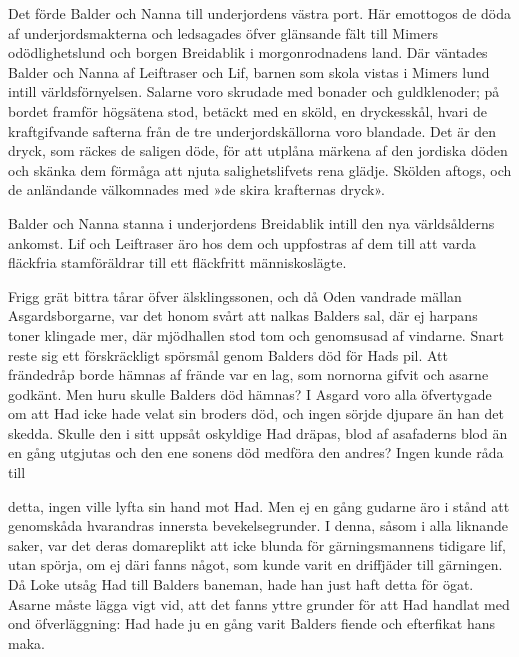 Det förde Balder och Nanna till underjordens västra port. Här emottogos
de döda af underjordsmakterna och ledsagades öfver glänsande fält till
Mimers odödlighetslund och borgen Breidablik i morgonrodnadens land. Där
väntades Balder och Nanna af Leiftraser och Lif, barnen som skola vistas
i Mimers lund intill världsförnyelsen. Salarne voro skrudade med bonader
och guldklenoder; på bordet framför högsätena stod, betäckt med en
sköld, en dryckesskål, hvari de kraftgifvande safterna från de tre
underjordskällorna voro blandade. Det är den dryck, som räckes de
saligen döde, för att utplåna märkena af den jordiska döden och skänka
dem förmåga att njuta salighetslifvets rena glädje. Skölden aftogs, och
de anländande välkomnades med »de skira krafternas dryck».

Balder och Nanna stanna i underjordens Breidablik intill den nya
världsålderns ankomst. Lif och Leiftraser äro hos dem och uppfostras af
dem till att varda fläckfria stamföräldrar till ett fläckfritt
människoslägte.

Frigg grät bittra tårar öfver älsklingssonen, och då Oden vandrade
mällan Asgardsborgarne, var det honom svårt att nalkas Balders sal, där
ej harpans toner klingade mer, där mjödhallen stod tom och genomsusad af
vindarne. Snart reste sig ett förskräckligt spörsmål genom Balders död
för Hads pil. Att frändedråp borde hämnas af frände var en lag, som
nornorna gifvit och asarne godkänt. Men huru skulle Balders död hämnas?
I Asgard voro alla öfvertygade om att Had icke hade velat sin broders
död, och ingen sörjde djupare än han det skedda. Skulle den i sitt
uppsåt oskyldige Had dräpas, blod af asafaderns blod än en gång utgjutas
och den ene sonens död medföra den andres? Ingen kunde råda till

detta, ingen ville lyfta sin hand mot Had. Men ej en gång gudarne äro i
stånd att genomskåda hvarandras innersta bevekelsegrunder. I denna,
såsom i alla liknande saker, var det deras domareplikt att icke blunda
för gärningsmannens tidigare lif, utan spörja, om ej däri fanns något,
som kunde varit en driffjäder till gärningen. Då Loke utsåg Had till
Balders baneman, hade han just haft detta för ögat. Asarne måste lägga
vigt vid, att det fanns yttre grunder för att Had handlat med ond
öfverläggning: Had hade ju en gång varit Balders fiende och efterfikat
hans maka.

